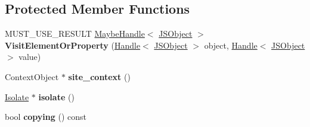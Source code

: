 \subsection*{Protected Member Functions}
\begin{DoxyCompactItemize}
\item 
M\+U\+S\+T\+\_\+\+U\+S\+E\+\_\+\+R\+E\+S\+U\+LT \hyperlink{classv8_1_1internal_1_1_maybe_handle}{Maybe\+Handle}$<$ \hyperlink{classv8_1_1internal_1_1_j_s_object}{J\+S\+Object} $>$ {\bfseries Visit\+Element\+Or\+Property} (\hyperlink{classv8_1_1internal_1_1_handle}{Handle}$<$ \hyperlink{classv8_1_1internal_1_1_j_s_object}{J\+S\+Object} $>$ object, \hyperlink{classv8_1_1internal_1_1_handle}{Handle}$<$ \hyperlink{classv8_1_1internal_1_1_j_s_object}{J\+S\+Object} $>$ value)\hypertarget{classv8_1_1internal_1_1_j_s_object_walk_visitor_ac1373180cf7b13ce74dffd40017a151d}{}\label{classv8_1_1internal_1_1_j_s_object_walk_visitor_ac1373180cf7b13ce74dffd40017a151d}

\item 
Context\+Object $\ast$ {\bfseries site\+\_\+context} ()\hypertarget{classv8_1_1internal_1_1_j_s_object_walk_visitor_a7fd73991b906bb9d452b20b43c4c4c2f}{}\label{classv8_1_1internal_1_1_j_s_object_walk_visitor_a7fd73991b906bb9d452b20b43c4c4c2f}

\item 
\hyperlink{classv8_1_1internal_1_1_isolate}{Isolate} $\ast$ {\bfseries isolate} ()\hypertarget{classv8_1_1internal_1_1_j_s_object_walk_visitor_a9628537ba61aceb5eaa1200d2134a1d8}{}\label{classv8_1_1internal_1_1_j_s_object_walk_visitor_a9628537ba61aceb5eaa1200d2134a1d8}

\item 
bool {\bfseries copying} () const \hypertarget{classv8_1_1internal_1_1_j_s_object_walk_visitor_abc243d3fe9e1311bacd36219f65b4ceb}{}\label{classv8_1_1internal_1_1_j_s_object_walk_visitor_abc243d3fe9e1311bacd36219f65b4ceb}

\end{DoxyCompactItemize}
